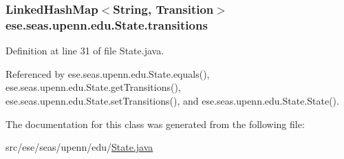 \subsubsection[{transitions}]{\setlength{\rightskip}{0pt plus 5cm}Linked\+Hash\+Map$<$String, {\bf Transition}$>$ ese.\+seas.\+upenn.\+edu.\+State.\+transitions\hspace{0.3cm}{\ttfamily [private]}}\label{classese_1_1seas_1_1upenn_1_1edu_1_1_state_aeac8f20207dd613d1b9f3524315d7ff3}


Definition at line 31 of file State.\+java.



Referenced by ese.\+seas.\+upenn.\+edu.\+State.\+equals(), ese.\+seas.\+upenn.\+edu.\+State.\+get\+Transitions(), ese.\+seas.\+upenn.\+edu.\+State.\+set\+Transitions(), and ese.\+seas.\+upenn.\+edu.\+State.\+State().



The documentation for this class was generated from the following file\+:\begin{DoxyCompactItemize}
\item 
src/ese/seas/upenn/edu/\hyperlink{_state_8java}{State.\+java}\end{DoxyCompactItemize}
